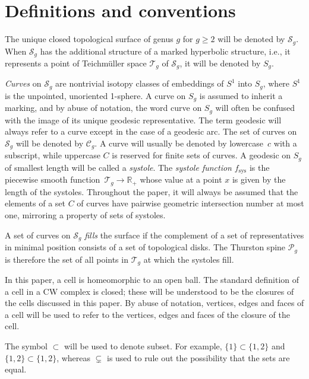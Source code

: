 \section{Definitions and conventions}
\label{sub:defns}

The unique closed topological surface of genus $g$ for $g\geq 2$ will be denoted by $\mathcal{S}_{g}$. When $\mathcal{S}_{g}$ has the additional structure of a marked hyperbolic structure, i.e., it represents a point of Teichm\"uller space $\mathcal{T}_{g}$ of $\mathcal{S}_{g}$, it will be denoted by $S_{g}$.

\textit{Curves} on $\mathcal{S}_{g}$ are nontrivial isotopy classes of embeddings of $S^{1}$ into $S_{g}$, where $S^{1}$ is the unpointed, unoriented 1-sphere. A curve on $S_{g}$ is assumed to inherit a marking, and by abuse of notation, the word curve on $S_{g}$ will often be confused with the image of its unique geodesic representative. The term geodesic will always refer to a curve except in the case of a geodesic arc. The set of curves on $\mathcal{S}_{g}$ will be denoted by $\mathcal{C}_{g}$. A curve will usually be denoted by lowercase~$c$ with a subscript, while uppercase $C$ is reserved for finite sets of curves. A geodesic on $S_{g}$ of smallest length will be called a \textit{systole}. The \textit{systole function} $f_{\mathrm{sys}}$ is the piecewise smooth function~${\mathcal{T}_{g}\rightarrow \mathbb{R}_{+}}$ whose value at a point $x$ is given by the length of the systoles. Throughout the paper, it will always be assumed that the elements of a set $C$ of curves have pairwise geometric intersection number at most one, mirroring a property of sets of systoles.

A set of curves on $\mathcal{S}_{g}$ \textit{fills} the surface if the complement of a set of representatives in minimal position consists of a set of topological disks. The Thurston spine $\mathcal{P}_{g}$ is therefore the set of all points in $\mathcal{T}_{g}$ at which the systoles fill.

In this paper, a cell is homeomorphic to an open ball. The standard definition of a cell in a CW complex is closed; these will be understood to be the closures of the cells discussed in this paper. By abuse of notation, vertices, edges and faces of a cell will be used to refer to the vertices, edges and faces of the closure of the cell.

The symbol $\subset$ will be used to denote subset. For example, $\{1\}\subset \{1,2\}$ and $\{1,2\}\subset \{1,2\}$, whereas $\subsetneq$ is used to rule out the possibility that the sets are equal.

